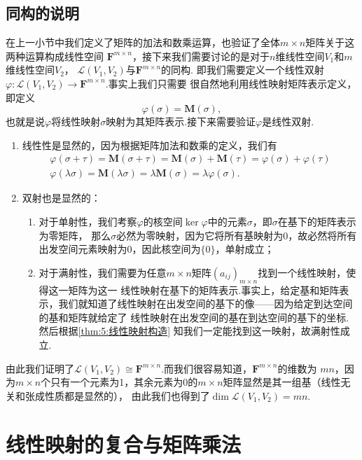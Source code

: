 \subsection{同构的说明}
在上一小节中我们定义了矩阵的加法和数乘运算，也验证了全体$m\times n$矩阵关于这两种运算构成线性空间
$\mathbf{F}^{m\times n}$，接下来我们需要讨论的是对于$n$维线性空间$V_1$和$m$维线性空间$V_2$，
$\mathcal{L}(V_1,V_2)$与$\mathbf{F}^{m\times n}$的同构.
即我们需要定义一个线性双射$\varphi:\mathcal{L}(V_1,V_2)\to\mathbf{F}^{m\times n}$.事实上我们只需要
很自然地利用线性映射矩阵表示定义，即定义
\[\varphi(\sigma)=\mathbf{M}(\sigma),\]
也就是说$\varphi$将线性映射$\sigma$映射为其矩阵表示.接下来需要验证$\varphi$是线性双射.
\begin{enumerate}
    \item 线性性是显然的，因为根据矩阵加法和数乘的定义，我们有
    \begin{gather*}
        \varphi(\sigma+\tau)=\mathbf{M}(\sigma+\tau)=\mathbf{M}(\sigma)+\mathbf{M}(\tau)=\varphi(\sigma)+\varphi(\tau) \\
        \varphi(\lambda\sigma)=\mathbf{M}(\lambda\sigma)=\lambda\mathbf{M}(\sigma)=\lambda\varphi(\sigma).
    \end{gather*}
    \item 双射也是显然的：
    \begin{enumerate}[label=(\arabic*)]
        \item 对于单射性，我们考察$\varphi$的核空间$\ker\varphi$中的元素$\sigma$，即$\sigma$在基下的矩阵表示为零矩阵，
        那么$\sigma$必然为零映射，因为它将所有基映射为0，故必然将所有出发空间元素映射为0，因此核空间为$\{0\}$，单射成立；
        \item 对于满射性，我们需要为任意$m\times n$矩阵$(a_{ij})_{m\times n}$找到一个线性映射，使得这一矩阵为这一
        线性映射在基下的矩阵表示.事实上，给定基和矩阵表示，我们就知道了线性映射在出发空间的基下的像——因为给定到达空间的基和矩阵就给定了
        线性映射在出发空间的基在到达空间的基下的坐标.然后根据\autoref{thm:5:线性映射构造} 知我们一定能找到这一映射，故满射性成立.
    \end{enumerate}
\end{enumerate}

由此我们证明了$\mathcal{L}(V_1,V_2)\cong\mathbf{F}^{m\times n}$.而我们很容易知道，$\mathbf{F}^{m\times n}$的维数为
$mn$，因为$m\times n$个只有一个元素为1，其余元素为0的$m\times n$矩阵显然是其一组基（线性无关和张成性质都是显然的），
由此我们也得到了$\dim\mathcal{L}(V_1,V_2)=mn$.

\section{线性映射的复合与矩阵乘法}
